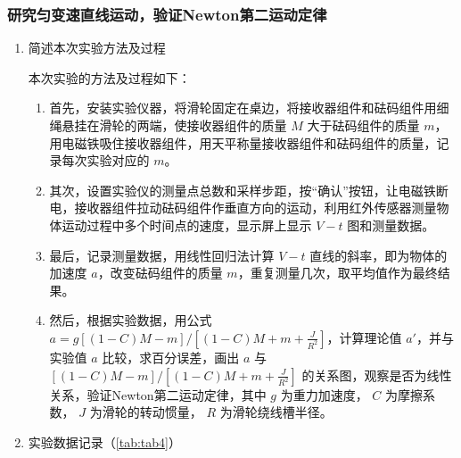 \documentclass[dvipsnames, svgnames,a4paper,11pt]{article}
\begin{document}
	\subsubsection{研究匀变速直线运动，验证Newton第二运动定律}
	\begin{enumerate}
		\item 简述本次实验方法及过程
		
		本次实验的方法及过程如下：
		
		\begin{enumerate}
			\item 首先，安装实验仪器，将滑轮固定在桌边，将接收器组件和砝码组件用细绳悬挂在滑轮的两端，使接收器组件的质量 \( M \) 大于砝码组件的质量 \( m \)，用电磁铁吸住接收器组件，用天平称量接收器组件和砝码组件的质量，记录每次实验对应的 \( m \)。
			
			\item 其次，设置实验仪的测量点总数和采样步距，按“确认”按钮，让电磁铁断电，接收器组件拉动砝码组件作垂直方向的运动，利用红外传感器测量物体运动过程中多个时间点的速度，显示屏上显示 \( V-t \) 图和测量数据。
			
			\item 最后，记录测量数据，用线性回归法计算 \( V-t \) 直线的斜率，即为物体的加速度 \( a \)，改变砝码组件的质量 \( m \)，重复测量几次，取平均值作为最终结果。
			
			\item 然后，根据实验数据，用公式 \( a = g\left[(1-C)M-m\right]/\left[(1-C)M+m+\frac{J}{R^2}\right] \)，计算理论值 \( a' \)，并与实验值 \( a \) 比较，求百分误差，画出 \( a \) 与 \(\left[(1-C)M-m\right]/\left[(1-C)M+m+\frac{J}{R^2}\right]\) 的关系图，观察是否为线性关系，验证Newton第二运动定律，其中 \( g \) 为重力加速度， \( C \) 为摩擦系数， \( J \) 为滑轮的转动惯量， \( R \) 为滑轮绕线槽半径。
		\end{enumerate}		
		
		\item 实验数据记录（\cref{tab:tab4}）
		

\end{enumerate}
\end{document}
